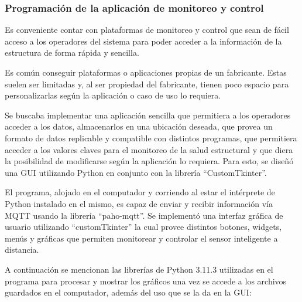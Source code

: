 \subsubsection{Programación de la aplicación de monitoreo y control}

Es conveniente contar con plataformas de monitoreo y control que sean de fácil acceso a los operadores del sistema para poder acceder a la información de la estructura de forma rápida y sencilla. 

Es común conseguir plataformas o aplicaciones propias de un fabricante. Estas suelen ser limitadas y, al ser propiedad del fabricante, tienen poco espacio para personalizarlas según la aplicación o caso de uso lo requiera.

Se buscaba implementar una aplicación sencilla que permitiera a los operadores acceder a los datos, almacenarlos en una ubicación deseada, que provea un formato de datos replicable y compatible con distintos programas, que permitiera acceder a los valores claves para el monitoreo de la salud estructural y que diera la posibilidad de modificarse según la aplicación lo requiera. Para esto, se diseñó una GUI utilizando Python en conjunto con la librería ``CustomTkinter''.

El programa, alojado en el computador y corriendo al estar el intérprete de Python instalado en el mismo, es capaz de enviar y recibir información vía MQTT usando la librería ``paho-mqtt''. Se implementó una interfaz gráfica de usuario utilizando ``customTkinter'' la cual provee distintos botones, widgets, menús y gráficas que permiten monitorear y controlar el sensor inteligente a distancia. 

A continuación se mencionan las librerías de Python 3.11.3 utilizadas en el programa para procesar y mostrar los gráficos una vez se accede a los archivos guardados en el computador, además del uso que se la da en la GUI:

